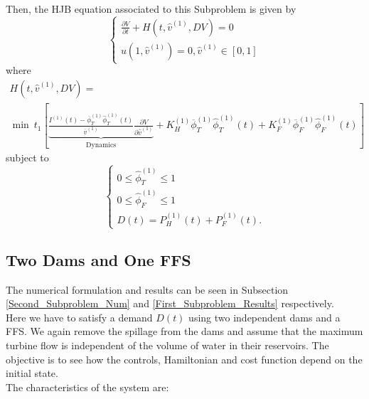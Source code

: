 Then, the HJB equation associated to this Subproblem is given by
\begin{equation}
\begin{cases}
\frac{\partial V}{\partial t}+H(t,\hat{v}^{(1)},DV)=0\\
u(1,\hat{v}^{(1)})=0,\hat{v}^{(1)}\in[0,1]
\end{cases}
\end{equation}
where
\begin{multline}
H(t,\hat{v}^{(1)},DV)=\\
\min\ t_1\left[\underbrace{\frac{I^{(1)}(t)-\overline{\phi}_T^{(1)}\hat{\phi}_T^{(1)}(t)}{\overline{v}^{(1)}}\frac{\partial V}{\partial \hat{v}^{(1)}}}_{\text{Dynamics}}+K_H^{(1)}\overline{\phi}_T^{(1)}\hat{\phi}_T^{(1)}(t)+K_F^{(1)}\overline{\phi}_F^{(1)}\hat{\phi}_F^{(1)}(t)\right]
\label{Hamiltonian_1}
\end{multline}
subject to
\begin{equation}
\begin{cases}
0\leq\hat{\phi}^{(1)}_T\leq1\\
0\leq\hat{\phi}^{(1)}_F\leq1\\
D(t)=P_H^{(1)}(t)+P_F^{(1)}(t).
\end{cases}
\end{equation}

\subsection{Two Dams and One FFS} \label{Second_Subproblem}

The numerical formulation and results can be seen in Subsection \ref{Second_Subproblem_Num} and \ref{First_Subproblem_Results} respectively.\\

Here we have to satisfy a demand $D(t)$ using two independent dams and a FFS. We again remove the spillage from the dams and assume that the maximum turbine flow is independent of the volume of water in their reservoirs. The objective is to see how the controls, Hamiltonian and cost function depend on the initial state.\\
The characteristics of the system are:

